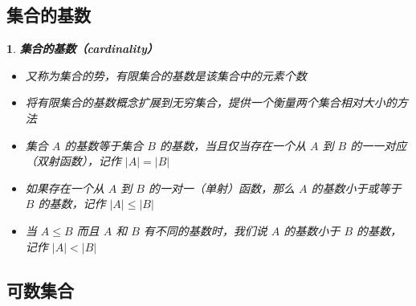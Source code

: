 \documentclass[UTF8]{report}
\theoremstyle{MyLineTheoremStyle} %
\theoremstyle{MyBlockTheoremStyle} %
\theoremstyle{MySubsubsectionStyle} %
\newtheorem{definition}{}
\begin{document}
\subsection{集合的基数}

\begin{definition}
    \textbf{集合的基数（cardinality）}\par
    \begin{itemize}
        \item 又称为集合的势，有限集合的基数是该集合中的元素个数
        \item 将有限集合的基数概念扩展到无穷集合，提供一个衡量两个集合相对大小的方法
        \item 集合 $A$ 的基数等于集合 $B$ 的基数，当且仅当存在一个从 $A$ 到 $B$ 的一一对应（双射函数），记作 $|A| = |B|$
        \item 如果存在一个从 $A$ 到 $B$ 的一对一（单射）函数，那么 $A$ 的基数小于或等于 $B$ 的基数，记作 $|A| \leq |B|$
        \item 当 $A \leq B$ 而且 $A$ 和 $B$ 有不同的基数时，我们说 $A$ 的基数小于 $B$ 的基数，记作 $|A| < |B|$
    \end{itemize}
\end{definition}

\subsection{可数集合}
\end{document}
